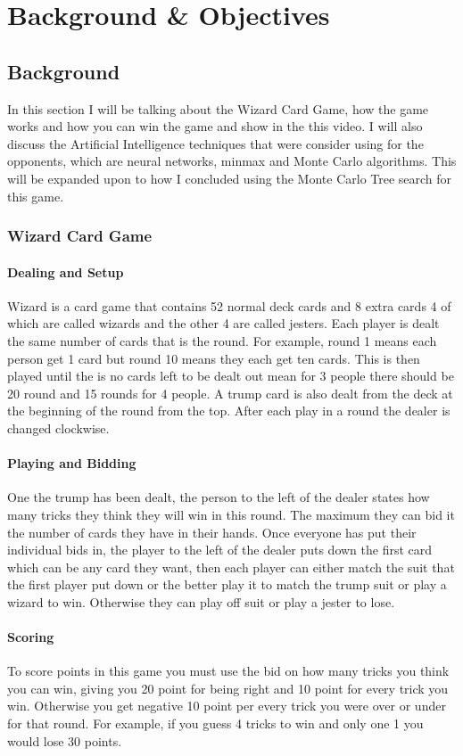 \chapter{Background \& Objectives}


\section{Background}
In this section I will be talking about the Wizard Card Game, how the game works and how you can win the game and show in the this video\cite{wizardVideo}. I will also discuss the Artificial Intelligence techniques that were consider using for the opponents, which are neural networks, minmax and Monte Carlo algorithms. This will be expanded upon to how I concluded using the Monte Carlo Tree search for this game.
\subsection{Wizard Card Game}
\subsubsection{Dealing and Setup}
Wizard is a card game that contains 52 normal deck cards and 8 extra cards 4 of which are called wizards and the other 4 are called jesters\cite{wizardOver}.  Each player is dealt the same number of cards that is the round. For example, round 1 means each person get 1 card but round 10 means they each get ten cards. This is then played until the is no cards left to be dealt out mean for 3 people there should be 20 round and 15 rounds for 4 people. A trump card is also dealt from the deck at the beginning of the round from the top.  After each play in a round the dealer is changed clockwise.
\subsubsection{Playing and Bidding}
One the trump has been dealt, the person to the left of the dealer states how many tricks they think they will win in this round. The maximum they can bid it the number of cards they have in their hands.  Once everyone has put their individual bids in, the player to the left of the dealer puts down the first card which can be any card they want, then each player can either match the suit that the first player put down or the better play it to match the trump suit or play a wizard to win. Otherwise they can play off suit or play a jester to lose.
\subsubsection{Scoring}
To score points in this game you must use the bid on how many tricks you think you can win, giving you 20 point for being right and 10 point for every trick you win. Otherwise you get negative 10 point per every trick you were over or under for that round. For example, if you guess 4 tricks to win and only one 1 you would lose 30 points. 

